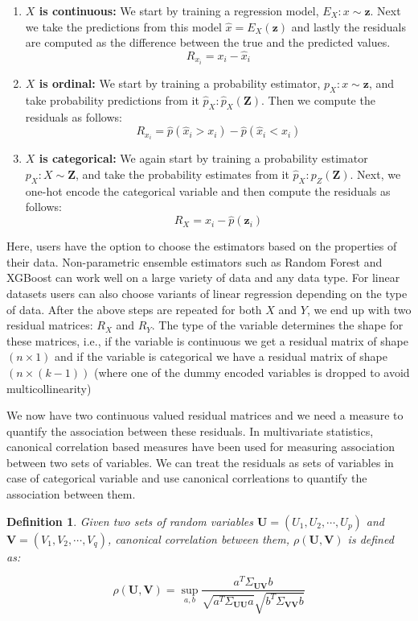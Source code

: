 \documentclass[letterpaper]{article} %
\newtheorem{definition}{Definition}
\begin{document}
\begin{enumerate}
	\item \textbf{$ X $ is continuous:} We start by training a regression
		model, $ E_X: x \sim \bm{z} $. Next we take the predictions
		from this model $ \hat{x} = E_X(\bm{z}) $ and lastly the
		residuals are computed as the difference between the true and
		the predicted values.
		$$ R_{x_i} = x_i - \hat{x}_i $$
	\item \textbf{$ X $ is ordinal:} We start by training a probability
		estimator, $ p_X: x \sim \bm{z} $, and take probability
		predictions from it $ \hat{p}_X: \hat{p}_X(\bm{Z}) $. Then we
		compute the residuals as follows:
		$$ R_{x_i} = \hat{p}(\hat{x}_i > x_i) - \hat{p}(\hat{x}_i < x_i) $$
	\item \textbf{$ X $ is categorical:} We again start by training a
		probability estimator $ p_X: X \sim \bm{Z} $, and take the
		probability estimates from it $ \hat{p}_X: p_Z(\bm{Z}) $. Next,
		we one-hot encode the categorical variable and then compute the
		residuals as follows: 
		$$ R_X = x_i - \hat{p}(\bm{z}_i) $$
\end{enumerate}


Here, users have the option to choose the estimators based on the properties of
their data. Non-parametric ensemble estimators such as Random Forest and
XGBoost can work well on a large variety of data and any data type. For linear
datasets users can also choose variants of linear regression depending on the
type of data. After the above steps are repeated for both $ X $ and $ Y $, we
end up with two residual matrices: $ R_X $ and $ R_Y $. The type of the
variable determines the shape for these matrices, i.e., if the variable is
continuous we get a residual matrix of shape $ ( n \times 1 ) $ and if the
variable is categorical we have a residual matrix of shape $ ( n \times (k-1))
$ (where one of the dummy encoded variables is dropped to avoid
multicollinearity)

We now have two continuous valued residual matrices and we need a measure to
quantify the association between these residuals. In multivariate statistics,
canonical correlation based measures have been used for measuring association
between two sets of variables. We can treat the residuals as sets of variables
in case of categorical variable and use canonical corrleations to quantify the
association between them.

\begin{definition}
	Given two sets of random variables $ \bm{U} = (U_1, U_2, \cdots, U_p) $
	and $ \bm{V} = (V_1, V_2, \cdots, V_q) $, canonical correlation between
	them, $\rho(\bm{U}, \bm{V}) $ is defined as:
		
	\begin{equation}
		\rho(\bm{U}, \bm{V}) = \sup_{a, b} \frac{a^T \Sigma_{\bm{U}\bm{V}} b}{\sqrt{a^T \Sigma_{\bm{U}\bm{U}} a} \sqrt{b^T \Sigma_{\bm{V}\bm{V}} b}}
	\end{equation}

\end{definition}
	
\end{document}

